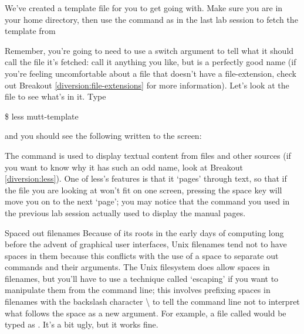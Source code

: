 We've created a template file for you to get going with. Make sure you are in your home directory, then use the  command as in the last lab session to fetch the template from  \\


Remember, you're going to need to use a switch argument to tell  what it should call the file it's fetched: call it anything you like, but  is a perfectly good name (if you're feeling uncomfortable about a file that doesn't have a file-extension, check out Breakout \ref{diversion:file-extensions} for more information). Let's look at the file to see what's in it. Type

\begin{ttoutenv}
\$ less mutt-template
\end{ttoutenv}


and you should see the following written to the screen:
\begin{ttoutenv}

\end{ttoutenv}


The  command is used to display textual content from files and other sources (if you want to know why it has such an odd name, look at Breakout \ref{diversion:less}). One of less's features is that it `pages' through text, so that if the file you are looking at won't fit on one screen, pressing the space key will move you on to the next `page'; you may notice that the  command you used in the previous lab session actually used  to display the manual pages.

\begin{linux}{Spaced out filenames}
Because of its roots in the early days of computing long before the advent of graphical user interfaces, Unix filenames tend not to have spaces in them because this conflicts with the use of a space to separate out commands and their arguments. The Unix filesystem does allow spaces in filenames, but you'll have to use a technique called `escaping' if you want to manipulate them from the command line; this involves prefixing spaces in filenames with the backslash character \textbackslash{} to tell the command line not to interpret what follows the space as a new argument. For example, a file called  would be typed as . It's a bit ugly, but it works fine. 
\end{linux} 

